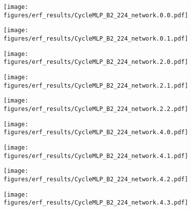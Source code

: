 \documentclass{article}
\begin{document}
\begin{figure}[tb]
  \raggedright
  \begin{minipage}[t]{0.13\hsize}
    \centering
    \texttt{[image: figures/erf\_results/CycleMLP\_B2\_224\_network.0.0.pdf]}
    \label{figure:erf_cyclemlp:0}
  \end{minipage}
  \begin{minipage}[t]{0.13\hsize}
    \centering
    \texttt{[image: figures/erf\_results/CycleMLP\_B2\_224\_network.0.1.pdf]}
    \label{figure:erf_cyclemlp:1}
  \end{minipage}
  \begin{minipage}[t]{0.13\hsize}
    \centering
    \texttt{[image: figures/erf\_results/CycleMLP\_B2\_224\_network.2.0.pdf]}
    \label{figure:erf_cyclemlp:2}
  \end{minipage}
  \begin{minipage}[t]{0.13\hsize}
    \centering
    \texttt{[image: figures/erf\_results/CycleMLP\_B2\_224\_network.2.1.pdf]}
    \label{figure:erf_cyclemlp:3}
  \end{minipage}
  \begin{minipage}[t]{0.13\hsize}
    \centering
    \texttt{[image: figures/erf\_results/CycleMLP\_B2\_224\_network.2.2.pdf]}
    \label{figure:erf_cyclemlp:4}
  \end{minipage}
  \begin{minipage}[t]{0.13\hsize}
    \centering
    \texttt{[image: figures/erf\_results/CycleMLP\_B2\_224\_network.4.0.pdf]}
    \label{figure:erf_cyclemlp:5}
  \end{minipage}
  \begin{minipage}[t]{0.13\hsize}
    \centering
    \texttt{[image: figures/erf\_results/CycleMLP\_B2\_224\_network.4.1.pdf]}
    \label{figure:erf_cyclemlp:6}
  \end{minipage}
  \begin{minipage}[t]{0.13\hsize}
    \centering
    \texttt{[image: figures/erf\_results/CycleMLP\_B2\_224\_network.4.2.pdf]}
    \label{figure:erf_cyclemlp:7}
  \end{minipage}
  \begin{minipage}[t]{0.13\hsize}
    \centering
    \texttt{[image: figures/erf\_results/CycleMLP\_B2\_224\_network.4.3.pdf]}

\end{minipage}
\end{figure}
\end{document}
